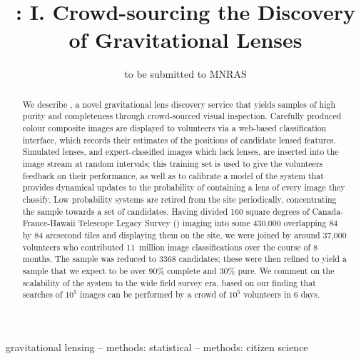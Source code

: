 \documentclass[useAMS,usenatbib,a4paper]{mn2e}
\title[\SW]
{\SW: I. Crowd-sourcing the Discovery of Gravitational Lenses}
\author[Marshall et al.]{%
  
}
\begin{document}
\date{to be submitted to MNRAS}
\pagerange{\pageref{firstpage}--\pageref{lastpage}}

\maketitle

\label{firstpage}


\begin{abstract}

We describe \SW, a novel gravitational lens discovery service that yields
samples of high purity and completeness through crowd-sourced visual inspection.
Carefully produced colour composite images are displayed to volunteers via a
web-based classification interface, which records their estimates of the positions of
candidate lensed features. Simulated lenses, and expert-classified images which
lack lenses, are inserted into the image stream at random intervals; this
training set is used to give the volunteers feedback on their performance, as
well as to calibrate a model of the system that provides
dynamical updates to the probability of containing a lens
of every image they classify. Low probability systems are
retired from the site periodically, concentrating the sample towards a set of
candidates. Having divided 160 square degrees of Canada-France-Hawaii Telescope
Legacy Survey (\cfhtls) imaging into some 430,000 overlapping 84 by 84 arcsecond
tiles and displaying them on the site, we were joined by around 37,000
volunteers who contributed 11~million image classifications over the course of 8
months. The sample was reduced to 3368 \StageOne candidates; these were then
refined to yield a sample that we expect to be over 90\% complete and 30\% pure.
We comment on the scalability of the \SW system to the wide field survey era,
based on our finding that searches of $10^5$ images can be performed by a
crowd of $10^5$ volunteers in 6 days.
\end{abstract}


\begin{keywords}
  gravitational lensing   --
  methods: statistical    --
  methods: citizen science
\end{keywords}

\setcounter{footnote}{1}
\end{document}
